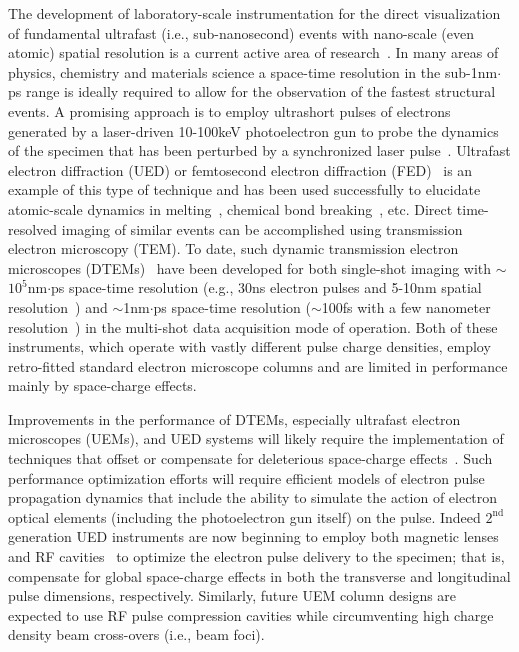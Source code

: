 The development of laboratory-scale instrumentation for the direct visualization of fundamental ultrafast (i.e., sub-nanosecond) events with nano-scale (even atomic) spatial resolution is a current active area of research~\cite{king_ultrafast_2005}.
In many areas of physics, chemistry and materials science a space-time resolution in the sub-1nm$\cdot$ps range is ideally required to allow for the observation of the fastest structural events.
A promising approach is to employ ultrashort pulses of electrons generated by a laser-driven 10-100keV photoelectron gun to probe the dynamics of the specimen that has been perturbed by a synchronized laser pulse~\cite{king_ultrafast_2005}.
Ultrafast electron diffraction (UED) or femtosecond electron diffraction (FED)~\cite{srinivasan_ultrafast_2003,williamson_clocking_1997,cao_femtosecond_2003} is an example of this type of technique and has been used successfully to elucidate atomic-scale dynamics in melting~\cite{cao_femtosecond_2003,sciaini_electronic_2009,siwick_atomic-level_2003}, chemical bond breaking~\cite{zewail_laser_1988}, etc.
Direct time-resolved imaging of similar events can be accomplished using transmission electron microscopy (TEM).
To date, such dynamic transmission electron microscopes (DTEMs)~\cite{bostanjoglo_tracing_1980,domer_high-speed_2003} have been developed for both single-shot imaging with $\sim$$10^{5}$nm$\cdot$ps space-time resolution (e.g., 30ns electron pulses and 5-10nm spatial resolution~\cite{lagrange_single-shot_2006,armstrong_practical_2007}) and $\sim$1nm$\cdot$ps space-time resolution ($\sim$100fs with a few nanometer resolution~\cite{park_direct_2009}) in the multi-shot data acquisition mode of operation.
Both of these instruments, which operate with vastly different pulse charge densities, employ retro-fitted standard electron microscope columns and are limited in performance mainly by space-charge effects.

Improvements in the performance of DTEMs, especially ultrafast electron microscopes (UEMs), and UED systems will likely require the implementation of techniques that offset or compensate for deleterious space-charge effects~\cite{armstrong_prospects_2007,lobastov_four-dimensional_2005}.
Such performance optimization efforts will require efficient models of electron pulse propagation dynamics that include the ability to simulate the action of electron optical elements (including the photoelectron gun itself) on the pulse.
Indeed $2^{\text{nd}}$ generation UED instruments are now beginning to employ both magnetic lenses and RF cavities~\cite{oudheusden_electron_2007,veisz_hybrid_2007} to optimize the electron pulse delivery to the specimen; that is, compensate for global space-charge effects in both the transverse and longitudinal pulse dimensions, respectively.
Similarly, future UEM column designs are expected to use RF pulse compression cavities while circumventing high charge density beam cross-overs (i.e., beam foci).

